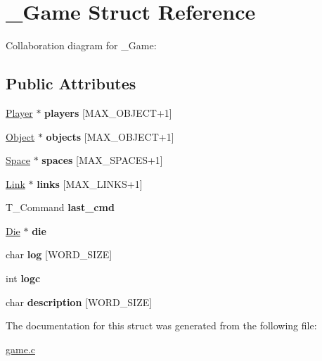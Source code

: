 \hypertarget{struct__Game}{}\section{\+\_\+\+Game Struct Reference}
\label{struct__Game}


Collaboration diagram for \+\_\+\+Game\+:
\subsection*{Public Attributes}
\begin{DoxyCompactItemize}
\item 
\mbox{\label{struct__Game_a18695773bcb51e9c2a386920db93dc7e}} 
\hyperlink{struct__Player}{Player} $\ast$ {\bfseries players} \mbox{[}M\+A\+X\+\_\+\+O\+B\+J\+E\+CT+1\mbox{]}
\item 
\mbox{\label{struct__Game_a0ce7fb559902c9a76f72e51692257650}} 
\hyperlink{struct__Object}{Object} $\ast$ {\bfseries objects} \mbox{[}M\+A\+X\+\_\+\+O\+B\+J\+E\+CT+1\mbox{]}
\item 
\mbox{\label{struct__Game_ab4180417d9148f8abb2233ca6c4ecfe5}} 
\hyperlink{struct__Space}{Space} $\ast$ {\bfseries spaces} \mbox{[}M\+A\+X\+\_\+\+S\+P\+A\+C\+ES+1\mbox{]}
\item 
\mbox{\label{struct__Game_a672f97aff892c65a6fdb43665cb57c97}} 
\hyperlink{struct__Link}{Link} $\ast$ {\bfseries links} \mbox{[}M\+A\+X\+\_\+\+L\+I\+N\+KS+1\mbox{]}
\item 
\mbox{\label{struct__Game_a27727b50ea0904a1fe9e1c55c27f2cf1}} 
T\+\_\+\+Command {\bfseries last\+\_\+cmd}
\item 
\mbox{\label{struct__Game_a0d6009b5dcb080489c192a9198fa7d46}} 
\hyperlink{structdie}{Die} $\ast$ {\bfseries die}
\item 
\mbox{\label{struct__Game_a2aff80fe3bb330cc216e32fc287cd96f}} 
char {\bfseries log} \mbox{[}W\+O\+R\+D\+\_\+\+S\+I\+ZE\mbox{]}
\item 
\mbox{\label{struct__Game_a26ffd4f3bc2d9566c5a38004454bec1d}} 
int {\bfseries logc}
\item 
\mbox{\label{struct__Game_a949f82789d8090083780b092d7b1b1ad}} 
char {\bfseries description} \mbox{[}W\+O\+R\+D\+\_\+\+S\+I\+ZE\mbox{]}
\end{DoxyCompactItemize}


The documentation for this struct was generated from the following file\+:\begin{DoxyCompactItemize}
\item 
\hyperlink{game_8c}{game.\+c}\end{DoxyCompactItemize}

